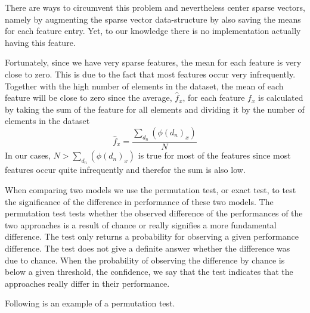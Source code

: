 There are ways to circumvent this problem and nevertheless center sparse vectors, namely by augmenting the sparse vector data-structure by also saving the means for each feature entry.
Yet, to our knowledge there is no implementation actually having this feature.

Fortunately, since we have very sparse features, the mean for each feature is very close to zero.
This is due to the fact that most features occur very infrequently. Together with the high number of elements in the dataset, the mean of each feature will be close to zero since the average, $\hat{f}_x$, for each feature $f_x$ is calculated by taking the sum of the feature for all elements and dividing it by the number of elements in the dataset
\begin{equation*}
\hat{f}_x = \frac{\sum_{d_n} (\phi(d_n)_x)}{N}
\end{equation*}
In our cases, $N > \sum_{d_n} (\phi(d_n)_x)$ is true for most of the features since most features occur quite infrequently and therefor the sum is also low.

When comparing two models we use the permutation test, or exact test, to test the significance of the difference in performance of these two models.
The permutation test tests whether the observed difference of the performances of the two approaches is a result of chance or really signifies a more fundamental difference.
The test only returns a probability for observing a given performance difference. The test does not give a definite answer whether the difference was due to chance.
When the probability of observing the difference by chance is below a given threshold, the confidence, we say that the test indicates that the approaches really differ in their performance.

Following is an example of a permutation test.



